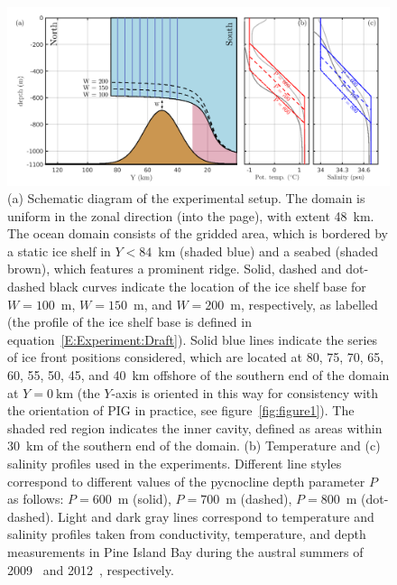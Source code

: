 \documentclass[draft]{agujournal2019}
\begin{document}
\begin{figure}
    \centering
    \includegraphics[width = \textwidth]{../make_figures/plots/figure2.pdf}
    \caption{(a) Schematic diagram of the experimental setup. The domain is uniform in the zonal direction (into the page), with extent 48~km. The ocean domain consists of the gridded area, which is bordered by a static ice shelf in $Y < 84$~km (shaded blue) and a seabed (shaded brown), which features a prominent ridge. Solid, dashed and dot-dashed black curves indicate the location of the ice shelf base for $W=100$~m, $W=150$~m, and $W=200$~m, respectively, as labelled (the profile of the ice shelf base is defined in equation~\eqref{E:Experiment:Draft}). Solid blue lines indicate the series of ice front positions considered, which are located at 80, 75, 70, 65, 60, 55, 50, 45, and 40~km offshore of the southern end of the domain at $Y = 0~\text{km}$ (the $Y$-axis is oriented in this way for consistency with the orientation of PIG in practice, see figure~\ref{fig:figure1}). The shaded red region indicates the inner cavity, defined as areas within 30~km of the southern end of the domain. (b) Temperature and (c) salinity profiles used in the experiments. Different line styles correspond to different values of the pycnocline depth parameter $P$ as follows: $P=600$~m (solid), $P=700$~m (dashed), $P=800$~m (dot-dashed). Light and dark gray lines correspond to temperature and salinity profiles taken from conductivity, temperature, and depth measurements in Pine Island Bay during the austral summers of 2009~\cite{Jacobs2011NatureGeosci} and 2012~\cite{Dutrieux2014Science}, respectively.}
    \label{fig:figure2}
\end{figure}
\end{document}
